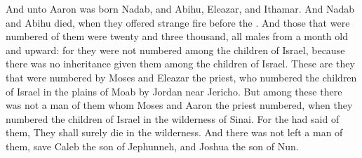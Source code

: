 \begin{biblechapter}
\verse And unto Aaron was born Nadab, and Abihu, Eleazar, and Ithamar.
\verse And Nadab and Abihu died, when they offered strange fire before the \LORD.
\verse And those that were numbered of them were twenty and three thousand, all males from a month old and upward: for they were not numbered among the children of Israel, because there was no inheritance given them among the children of Israel.
\verse These are they that were numbered by Moses and Eleazar the priest, who numbered the children of Israel in the plains of Moab by Jordan near Jericho.
\verse But among these there was not a man of them whom Moses and Aaron the priest numbered, when they numbered the children of Israel in the wilderness of Sinai.
\verse For the \LORD had said of them, They shall surely die in the wilderness. And there was not left a man of them, save Caleb the son of Jephunneh, and Joshua the son of Nun.
\end{biblechapter}

